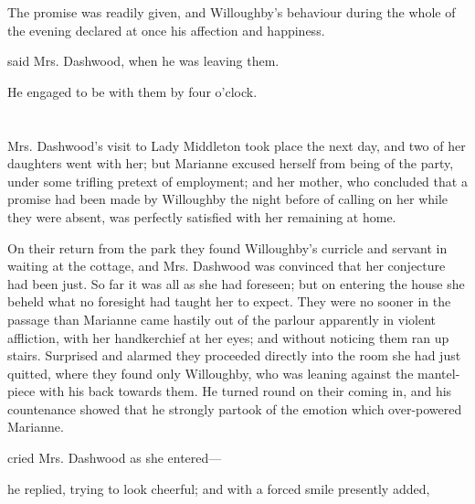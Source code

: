 The promise was readily given, and Willoughby's behaviour during the whole of the evening declared at once his affection and happiness.

 said Mrs. Dashwood, when he was leaving them. 

He engaged to be with them by four o'clock.

\chapter{} %

Mrs. Dashwood's visit to Lady Middleton took place the next day, and two of her daughters went with her; but Marianne excused herself from being of the party, under some trifling pretext of employment; and her mother, who concluded that a promise had been made by Willoughby the night before of calling on her while they were absent, was perfectly satisfied with her remaining at home.

On their return from the park they found Willoughby's curricle and servant in waiting at the cottage, and Mrs. Dashwood was convinced that her conjecture had been just. So far it was all as she had foreseen; but on entering the house she beheld what no foresight had taught her to expect. They were no sooner in the passage than Marianne came hastily out of the parlour apparently in violent affliction, with her handkerchief at her eyes; and without noticing them ran up stairs. Surprised and alarmed they proceeded directly into the room she had just quitted, where they found only Willoughby, who was leaning against the mantel-piece with his back towards them. He turned round on their coming in, and his countenance showed that he strongly partook of the emotion which over-powered Marianne.

 cried Mrs. Dashwood as she entered---

 he replied, trying to look cheerful; and with a forced smile presently added, 




